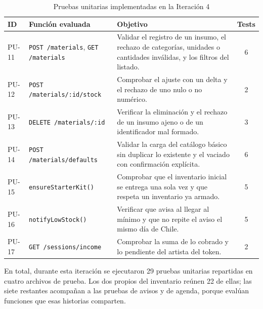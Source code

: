 \documentclass[12pt,letterpaper,oneside]{report}
\begin{document}
\begin{table}[t]
  \centering
  \caption{Pruebas unitarias implementadas en la Iteración 4}
  \label{tab:pruebas4}
  \renewcommand{\arraystretch}{1.2}
  \begin{tabular}{|l|p{3.4cm}|p{6.6cm}|c|}
    \hline
    \textbf{ID} & \textbf{Función evaluada} & \textbf{Objetivo} & \textbf{Tests} \\
    \hline
    PU-11 & \texttt{POST /materials}, \texttt{GET /materials} & Validar el registro de un insumo, el rechazo de categorías, unidades o cantidades inválidas, y los filtros del listado. & 6 \\ \hline
    PU-12 & \texttt{POST /materials/\newline :id/stock} & Comprobar el ajuste con un delta y el rechazo de uno nulo o no numérico. & 2 \\ \hline
    PU-13 & \texttt{DELETE /materials/:id} & Verificar la eliminación y el rechazo de un insumo ajeno o de un identificador mal formado. & 3 \\ \hline
    PU-14 & \texttt{POST /materials/\newline defaults} & Validar la carga del catálogo básico sin duplicar lo existente y el vaciado con confirmación explícita. & 6 \\ \hline
    PU-15 & \texttt{ensure\newline StarterKit()} & Comprobar que el inventario inicial se entrega una sola vez y que respeta un inventario ya armado. & 5 \\ \hline
    PU-16 & \texttt{notifyLow\newline Stock()} & Verificar que avisa al llegar al mínimo y que no repite el aviso el mismo día de Chile. & 5 \\ \hline
    PU-17 & \texttt{GET /sessions/\newline income} & Comprobar la suma de lo cobrado y lo pendiente del artista del token. & 2 \\ \hline
  \end{tabular}
\end{table}

En total, durante esta iteración se ejecutaron 29 pruebas unitarias repartidas en cuatro archivos de prueba. Los dos propios del inventario reúnen 22 de ellas; las siete restantes acompañan a las pruebas de avisos y de agenda, porque evalúan funciones que esas historias comparten.
\end{document}
